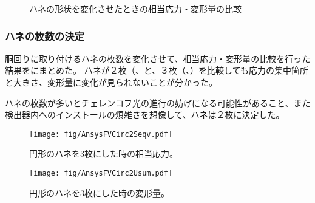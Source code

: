 \begin{figure}[htbp]
  \begin{minipage}{0.47\textwidth}
  \end{minipage}
  \hfill
  \begin{minipage}{0.47\textwidth}
  \end{minipage}
  \hfill
  \begin{minipage}{0.47\textwidth}
  \end{minipage}
  \hfill \begin{minipage}{0.47\textwidth}
  \end{minipage}
    \caption{ハネの形状を変化させたときの相当応力・変形量の比較}
  \label{AnsysFVSqCirc}
\end{figure}

\subsubsection{ハネの枚数の決定}
胴回りに取り付けるハネの枚数を変化させて、相当応力・変形量の比較を行った結果をにまとめた。
ハネが２枚（、と、３枚（、）を比較しても応力の集中箇所と大きさ、変形量に変化が見られないことが分かった。

ハネの枚数が多いとチェレンコフ光の進行の妨げになる可能性があること、また検出器内へのインストールの煩雑さを想像して、ハネは２枚に決定した。

\begin{figure}[htbp]
\begin{minipage}{0.47\textwidth}
\centering
\texttt{[image: fig/AnsysFVCirc2Seqv.pdf]}
\caption[円形のハネを3枚にした時の相当応力]{円形のハネを3枚にした時の相当応力。}
\label{AnsysFVCirc2Seqv}
\end{minipage}
\hfill
\begin{minipage}{0.47\textwidth}
\centering
\texttt{[image: fig/AnsysFVCirc2Usum.pdf]}
\caption[円形のハネを3枚にした時の変形量]{円形のハネを3枚にした時の変形量。}
\label{AnsysFVCirc2Usum}
\end{minipage}
\end{figure}
\fi%


